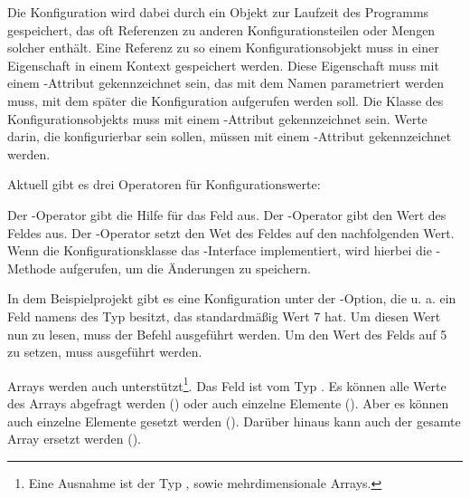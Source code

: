 Die Konfiguration wird dabei durch ein Objekt zur Laufzeit des Programms gespeichert, das oft Referenzen zu anderen Konfigurationsteilen oder Mengen solcher enthält.
Eine Referenz zu so einem Konfigurationsobjekt muss in einer Eigenschaft in einem Kontext gespeichert werden.
Diese Eigenschaft muss mit einem -Attribut gekennzeichnet sein, das mit dem Namen parametriert werden muss,
mit dem später die Konfiguration aufgerufen werden soll.
Die Klasse des Konfigurationsobjekts muss mit einem -Attribut gekennzeichnet sein.
Werte darin, die konfigurierbar sein sollen, müssen mit einem -Attribut gekennzeichnet werden.

Aktuell gibt es drei Operatoren für Konfigurationswerte:
\begin{outline}
 \1 Der -Operator gibt die Hilfe für das Feld aus.
 \1 Der -Operator gibt den Wert des Feldes aus.
 \1 Der -Operator setzt den Wet des Feldes auf den nachfolgenden Wert.
 Wenn die Konfigurationsklasse das -Interface implementiert, 
 wird hierbei die -Methode aufgerufen, um die \"Anderungen zu speichern.
 \end{outline}

In dem Beispielprojekt gibt es eine Konfiguration unter der -Option, die u. a. ein Feld namens  des Typ  besitzt,
das standardmäßig Wert 7 hat.
Um diesen Wert nun zu lesen, muss der Befehl  ausgeführt werden.
Um den Wert des Felds auf 5 zu setzen, muss  ausgeführt werden.

Arrays werden auch unterstützt\footnote{Eine Ausnahme ist der Typ , sowie mehrdimensionale Arrays.}.
Das Feld  ist vom Typ .
Es können alle Werte des Arrays abgefragt werden ()
oder auch einzelne Elemente ().
Aber es können auch einzelne Elemente gesetzt werden ().
Darüber hinaus kann auch der gesamte Array ersetzt werden ().

